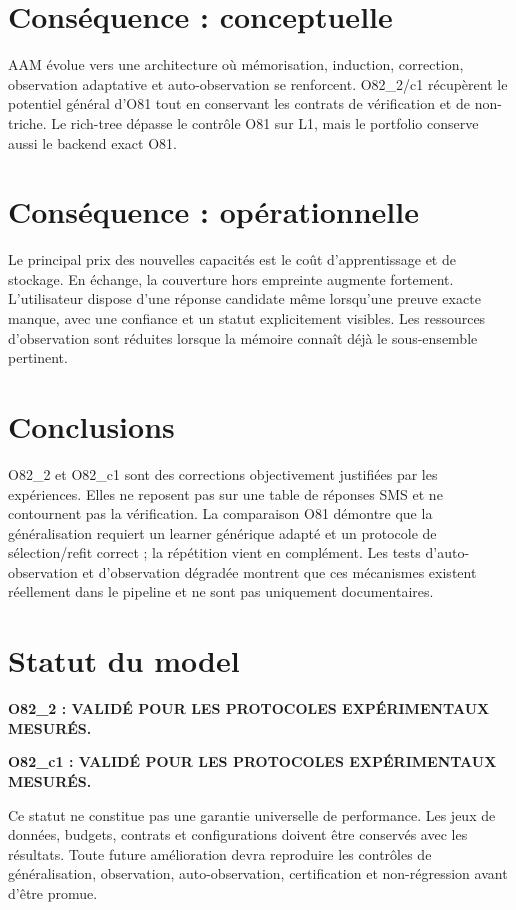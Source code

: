 \documentclass[11pt,a4paper]{report}
\begin{document}
\chapter{Conséquence : conceptuelle}
AAM évolue vers une architecture où mémorisation, induction, correction, observation adaptative et auto-observation se renforcent. O82\_2/c1 récupèrent le potentiel général d'O81 tout en conservant les contrats de vérification et de non-triche. Le rich-tree dépasse le contrôle O81 sur L1, mais le portfolio conserve aussi le backend exact O81.

\chapter{Conséquence : opérationnelle}
Le principal prix des nouvelles capacités est le coût d'apprentissage et de stockage. En échange, la couverture hors empreinte augmente fortement. L'utilisateur dispose d'une réponse candidate même lorsqu'une preuve exacte manque, avec une confiance et un statut explicitement visibles. Les ressources d'observation sont réduites lorsque la mémoire connaît déjà le sous-ensemble pertinent.

\chapter{Conclusions}
O82\_2 et O82\_c1 sont des corrections objectivement justifiées par les expériences. Elles ne reposent pas sur une table de réponses SMS et ne contournent pas la vérification. La comparaison O81 démontre que la généralisation requiert un learner générique adapté et un protocole de sélection/refit correct ; la répétition vient en complément. Les tests d'auto-observation et d'observation dégradée montrent que ces mécanismes existent réellement dans le pipeline et ne sont pas uniquement documentaires.

\chapter{Statut du model}
\textbf{O82\_2 : VALIDÉ POUR LES PROTOCOLES EXPÉRIMENTAUX MESURÉS.}

\textbf{O82\_c1 : VALIDÉ POUR LES PROTOCOLES EXPÉRIMENTAUX MESURÉS.}

Ce statut ne constitue pas une garantie universelle de performance. Les jeux de données, budgets, contrats et configurations doivent être conservés avec les résultats. Toute future amélioration devra reproduire les contrôles de généralisation, observation, auto-observation, certification et non-régression avant d'être promue.
\end{document}
